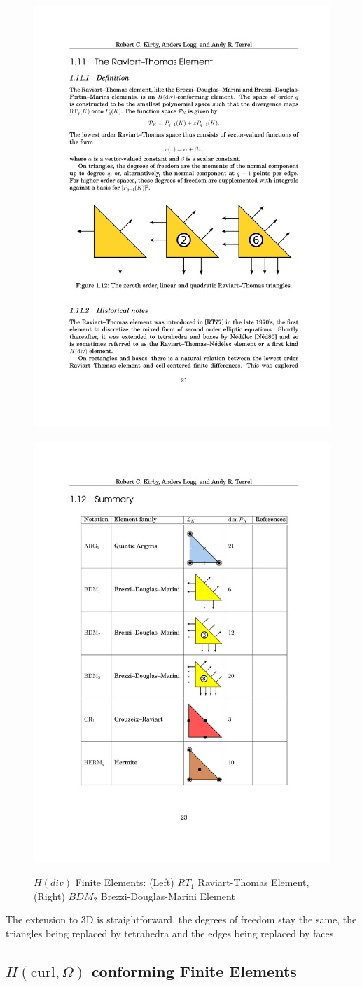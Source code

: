 \begin{figure}[ht]
\centerline{
\includegraphics[width=.3\textwidth]{figures/part_4/RT1.pdf}~~~~~~~~ 
\includegraphics[width=.3\textwidth]{figures/part_4/BDM2.pdf}}
\caption{\label{fig:HdivFE} $H(div)$ Finite Elements: (Left) $RT_1$ Raviart-Thomas Element, (Right) $BDM_2$ Brezzi-Douglas-Marini Element}
\end{figure}

\begin{remark}
The extension to 3D is straightforward, the degrees of freedom stay the same, the triangles being replaced by tetrahedra and the edges being replaced by faces.
\end{remark}


\subsection{ $H(\textrm{curl}, \Omega)$ conforming Finite Elements}

